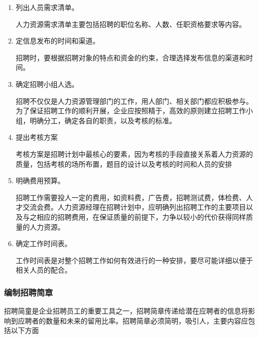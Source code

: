     \begin{enumerate}
        \item 列出人员需求清单。

        人力资源需求清单主要包括招聘的职位名称、人数、任职资格要求等内容。

        \item 定信息发布的时间和渠道。

        招聘时，要根据招聘对象的特点和资金的约束，合理选择发布信息的渠道和时间。

        \item  确定招聘小组人选。

        招聘不仅仅是人力资源管理部门的工作，用人部门、相关部门都应积极参与。为了保证招聘工作的顺利开展，企业应按照精于，高效的原则建立招聘工作小组，明确分工，确定各自的职责，以及考核的标准。

        \item 提出考核方案

        考核方案是招聘计划中最核心的要素，因为考核的手段直接关系着人力资源的质量，包括考核的场所布置，题目的设计以及考核的时间和人员的安排

        \item 明确费用预算。

        招聘工作需要投人一定的费用，如资料费，广告费，招聘测试费，体检费、人才交流会费。人力资源经理在招聘计划中，应明确列出招聘工作的主要项目以及与之相应的招聘费用，在保证质量的前提下，力争以较小的代价获得同样质量的人力资源。

        \item 确定工作时间表。

        工作时间表是对整个招聘工作如何有效进行的一种安排，要尽可能详细以便于相关人员的配合。
    \end{enumerate}

\subsubsection {编制招聘简章}

    招聘简童是企业招聘员工的重要工具之一，招聘简章传递给潜在应聘者的信息将影响到应聘者的数量和未来的留用比率。招聘简章必须简明，吸引人，主要内容应包括以下方面

